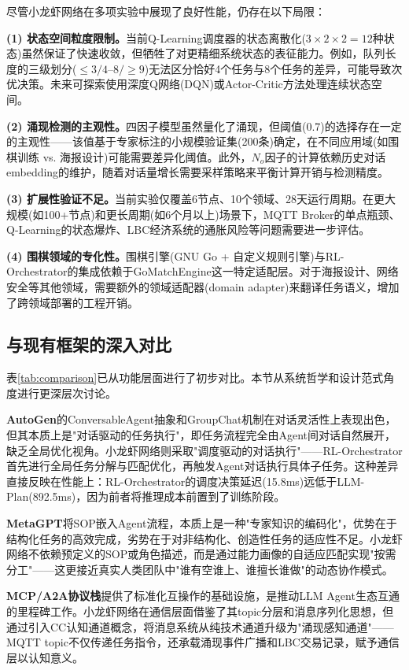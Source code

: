 \documentclass[12pt,a4paper]{ctexart}
\begin{document}
尽管小龙虾网络在多项实验中展现了良好性能，仍存在以下局限：

\textbf{(1) 状态空间粒度限制。}当前Q-Learning调度器的状态离散化($3 \times 2 \times 2 = 12$种状态)虽然保证了快速收敛，但牺牲了对更精细系统状态的表征能力。例如，队列长度的三级划分($\leq3/4$--$8/\geq9$)无法区分恰好4个任务与8个任务的差异，可能导致次优决策。未来可探索使用深度Q网络(DQN)或Actor-Critic方法处理连续状态空间。

\textbf{(2) 涌现检测的主观性。}四因子模型虽然量化了涌现，但阈值(0.7)的选择存在一定的主观性——该值基于专家标注的小规模验证集(200条)确定，在不同应用域(如围棋训练 vs. 海报设计)可能需要差异化阈值。此外，$N_o$因子的计算依赖历史对话embedding的维护，随着对话量增长需要采样策略来平衡计算开销与检测精度。

\textbf{(3) 扩展性验证不足。}当前实验仅覆盖6节点、10个领域、28天运行周期。在更大规模(如100+节点)和更长周期(如6个月以上)场景下，MQTT Broker的单点瓶颈、Q-Learning的状态爆炸、LBC经济系统的通胀风险等问题需要进一步评估。

\textbf{(4) 围棋领域的专化性。}围棋引擎(GNU Go + 自定义规则引擎)与RL-Orchestrator的集成依赖于GoMatchEngine这一特定适配层。对于海报设计、网络安全等其他领域，需要额外的领域适配器(domain adapter)来翻译任务语义，增加了跨领域部署的工程开销。

\subsection{与现有框架的深入对比}

表\ref{tab:comparison}已从功能层面进行了初步对比。本节从系统哲学和设计范式角度进行更深层次讨论。

\textbf{AutoGen\cite{wu2023autogen}}的ConversableAgent抽象和GroupChat机制在对话灵活性上表现出色，但其本质上是"对话驱动的任务执行"，即任务流程完全由Agent间对话自然展开，缺乏全局优化视角。小龙虾网络则采取"调度驱动的对话执行"——RL-Orchestrator首先进行全局任务分解与匹配优化，再触发Agent对话执行具体子任务。这种差异直接反映在性能上：RL-Orchestrator的调度决策延迟(15.8ms)远低于LLM-Plan(892.5ms)，因为前者将推理成本前置到了训练阶段。

\textbf{MetaGPT\cite{hong2024metagpt}}将SOP嵌入Agent流程，本质上是一种"专家知识的编码化"，优势在于结构化任务的高效完成，劣势在于对非结构化、创造性任务的适应性不足。小龙虾网络不依赖预定义的SOP或角色描述，而是通过能力画像的自适应匹配实现"按需分工"——这更接近真实人类团队中"谁有空谁上、谁擅长谁做"的动态协作模式。

\textbf{MCP/A2A协议栈}提供了标准化互操作的基础设施，是推动LLM Agent生态互通的里程碑工作。小龙虾网络在通信层面借鉴了其topic分层和消息序列化思想，但通过引入CC认知通道概念，将消息系统从纯技术通道升级为"涌现感知通道"——MQTT topic不仅传递任务指令，还承载涌现事件广播和LBC交易记录，赋予通信层以认知意义。
\end{document}
